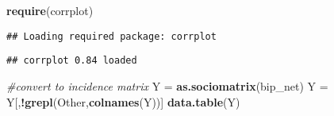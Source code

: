 \documentclass[
]{article}
\newenvironment{Shaded}{\begin{snugshade}}{\end{snugshade}}
\newcommand{\CommentTok}[1]{\textcolor[rgb]{0.56,0.35,0.01}{\textit{#1}}}
\newcommand{\KeywordTok}[1]{\textcolor[rgb]{0.13,0.29,0.53}{\textbf{#1}}}
\newcommand{\NormalTok}[1]{#1}
\newcommand{\OperatorTok}[1]{\textcolor[rgb]{0.81,0.36,0.00}{\textbf{#1}}}
\newcommand{\StringTok}[1]{\textcolor[rgb]{0.31,0.60,0.02}{#1}}
\begin{document}
\begin{Shaded}
\begin{Highlighting}[]
\KeywordTok{require}\NormalTok{(corrplot)}
\end{Highlighting}
\end{Shaded}

\begin{verbatim}
## Loading required package: corrplot
\end{verbatim}

\begin{verbatim}
## corrplot 0.84 loaded
\end{verbatim}

\begin{Shaded}
\begin{Highlighting}[]
\CommentTok{\#convert to incidence matrix}
\NormalTok{Y =}\StringTok{ }\KeywordTok{as.sociomatrix}\NormalTok{(bip\_net)}
\NormalTok{Y =}\StringTok{ }\NormalTok{Y[,}\OperatorTok{!}\KeywordTok{grepl}\NormalTok{(}\StringTok{\textquotesingle{}Other\textquotesingle{}}\NormalTok{,}\KeywordTok{colnames}\NormalTok{(Y))]}
\KeywordTok{data.table}\NormalTok{(Y)}
\end{Highlighting}
\end{Shaded}
\end{document}
